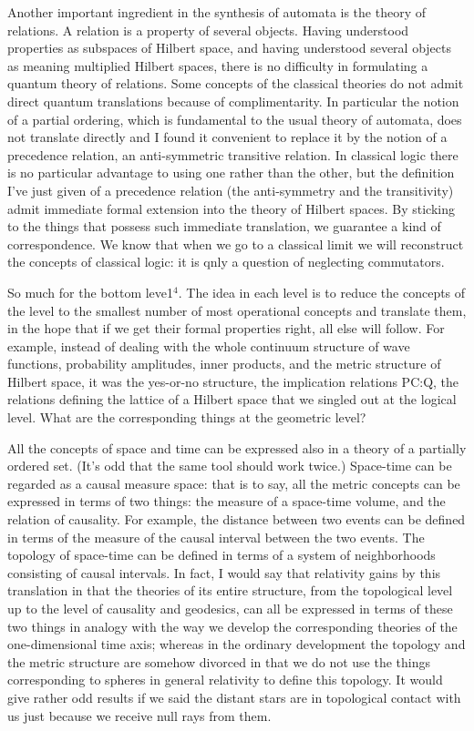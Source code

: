 Another important ingredient in the synthesis of automata is the theory of relations. A relation is a property of several objects. Having understood properties as subspaces of Hilbert space, and having understood several objects as meaning multiplied Hilbert spaces, there is no difficulty in formulating a quantum theory of relations. Some concepts of the classical theories do not admit direct quantum translations because of complimentarity. In particular the notion of a partial ordering, which is fundamental to the usual theory of automata, does not translate directly and I found it convenient to replace it by the notion of a precedence relation, an anti-symmetric transitive relation. In classical logic there is no particular advantage to using one rather than the other, but the definition I've just given of a precedence relation (the anti-symmetry and the transitivity) admit immediate formal extension into the theory of Hilbert spaces. By sticking to the things that possess such immediate translation, we guarantee a kind of correspondence. We know that when we go to a classical limit we will reconstruct the concepts of classical logic: it is qnly a question of neglecting commutators.

So much for the bottom leve1$^4$. The idea in each level is to reduce the concepts of the level to the smallest number of most operational concepts and translate them, in the hope that if we get their formal properties right, all else will follow. For example, instead of dealing with the whole continuum structure of wave functions, probability amplitudes, inner products, and the metric structure of Hilbert space, it was the yes-or-no structure, the implication relations PC:Q, the relations defining the lattice of a Hilbert space
that we singled out at the logical level. What are the
corresponding things at the geometric level?

All the concepts of space and time can be expressed also in a theory of a
partially ordered set. (It's odd that the same tool should work twice.)
Space-time can be regarded as a causal measure space: that is to say, all the
metric concepts can be expressed in terms of two things: the measure of a
space-time volume, and the relation of causality. For example, the distance
between two events can be defined in terms of the measure of the causal interval
between the two events. The topology of space-time can be defined in terms of a
system of neighborhoods consisting of causal intervals. In fact, I would say that
relativity gains by this translation in that the theories of its entire
structure, from the topological level up to the level of causality and geodesics,
can all be expressed in terms of these two things in analogy with the way we
develop the corresponding theories of the one-dimensional time axis; whereas in
the ordinary development the topology and the metric structure are somehow
divorced in that we do not use the things corresponding to spheres in general
relativity to define this topology. It would give rather odd results if we said
the distant stars are in topological contact with us just because we receive
null rays from them.

